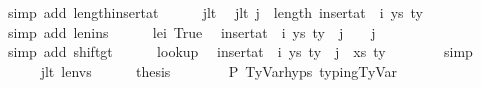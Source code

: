 \begin{isabellebody}
\ {\isacharparenleft}{\kern0pt}simp\ add{\isacharcolon}{\kern0pt}\ length{\isacharunderscore}{\kern0pt}insert{\isacharunderscore}{\kern0pt}at{\isacharparenright}{\kern0pt}\isanewline
\isanewline
\ \ \ \ \isamarkupfalse%
\ j{\isacharunderscore}{\kern0pt}lt\ \isamarkupfalse%
\ j{\isacharunderscore}{\kern0pt}lt{\isacharprime}{\kern0pt}{\isacharcolon}{\kern0pt}\ {\isachardoublequoteopen}j\ {\isacharless}{\kern0pt}\ length\ {\isacharparenleft}{\kern0pt}insert{\isacharunderscore}{\kern0pt}at\ {\isasymGamma}\ i\ {\isacharparenleft}{\kern0pt}ys{\isacharcomma}{\kern0pt}\ ty{}{\isacharparenright}{\kern0pt}{\isacharparenright}{\kern0pt}{\isachardoublequoteclose}\isanewline
\ \ \ \ \ \ \isamarkupfalse%
\ {\isacharparenleft}{\kern0pt}simp\ add{\isacharcolon}{\kern0pt}\ len{\isacharunderscore}{\kern0pt}ins{\isacharparenright}{\kern0pt}\isanewline
\isanewline
\ \ \ \ \isamarkupfalse%
\ le{\isacharunderscore}{\kern0pt}i\ True\ \isamarkupfalse%
\ {\isachardoublequoteopen}{\isacharparenleft}{\kern0pt}insert{\isacharunderscore}{\kern0pt}at\ {\isasymGamma}\ i\ {\isacharparenleft}{\kern0pt}ys{\isacharcomma}{\kern0pt}\ ty{}{\isacharparenright}{\kern0pt}{\isacharparenright}{\kern0pt}\ {\isacharbang}{\kern0pt}\ j\ {\isacharequal}{\kern0pt}\ {\isasymGamma}\ {\isacharbang}{\kern0pt}\ j{\isachardoublequoteclose}\isanewline
\ \ \ \ \ \ \isamarkupfalse%
\ {\isacharparenleft}{\kern0pt}simp\ add{\isacharcolon}{\kern0pt}\ shift{\isacharunderscore}{\kern0pt}gt{\isacharparenright}{\kern0pt}\isanewline
\isanewline
\ \ \ \ \isamarkupfalse%
\ lookup\ \isamarkupfalse%
\ {\isachardoublequoteopen}{\isacharparenleft}{\kern0pt}insert{\isacharunderscore}{\kern0pt}at\ {\isasymGamma}\ i\ {\isacharparenleft}{\kern0pt}ys{\isacharcomma}{\kern0pt}\ ty{}{\isacharparenright}{\kern0pt}{\isacharparenright}{\kern0pt}\ {\isacharbang}{\kern0pt}\ j\ {\isacharequal}{\kern0pt}\ {\isacharparenleft}{\kern0pt}xs{\isacharcomma}{\kern0pt}\ ty{\isacharparenright}{\kern0pt}{\isachardoublequoteclose}\isanewline
\ \ \ \ \ \ \isamarkupfalse%
\ simp\isanewline
\isanewline
\ \ \ \ \isamarkupfalse%
\ j{\isacharunderscore}{\kern0pt}lt{\isacharprime}{\kern0pt}\ len{\isacharunderscore}{\kern0pt}vs\isanewline
\ \ \ \ \isamarkupfalse%
\ {\isacharquery}{\kern0pt}thesis\isanewline
\ \ \ \ \ \ \isamarkupfalse%
\ P{}\ TyVar{\isachardot}{\kern0pt}hyps{\isacharparenleft}{\kern0pt}{}{\isacharcomma}{\kern0pt}{}{\isacharcomma}{\kern0pt}{}{\isacharparenright}{\kern0pt}\ typing{\isachardot}{\kern0pt}TyVar\ \isamarkupfalse%

\end{isabellebody}

